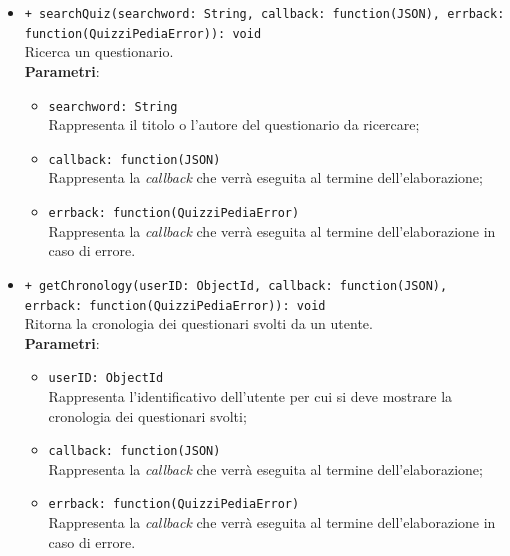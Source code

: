 \begin{itemize}
\begin{itemize}
			\item \texttt{+ searchQuiz(searchword: String, callback: function(JSON), errback: function(QuizziPediaError)): void}\\
			Ricerca un questionario.\\
			\textbf{Parametri}:
			\begin{itemize}
				\item \texttt{searchword: String}\\
				Rappresenta il titolo o l'autore del questionario da ricercare;
				\item \texttt{callback: function(JSON)}\\
				Rappresenta la \textit{callback} che verrà eseguita al termine dell'elaborazione;
				\item \texttt{errback: function(QuizziPediaError)}\\
				Rappresenta la \textit{callback} che verrà eseguita al termine dell'elaborazione in caso di errore.
			\end{itemize}
			
			\item \texttt{+ getChronology(userID: ObjectId, callback: function(JSON), errback: function(QuizziPediaError)): void}\\
			Ritorna la cronologia dei questionari svolti da un utente.\\
			\textbf{Parametri}:
			\begin{itemize}
				\item \texttt{userID: ObjectId}\\
				Rappresenta l'identificativo dell'utente per cui si deve mostrare la cronologia dei questionari svolti;
				\item \texttt{callback: function(JSON)}\\
				Rappresenta la \textit{callback} che verrà eseguita al termine dell'elaborazione;
				\item \texttt{errback: function(QuizziPediaError)}\\
				Rappresenta la \textit{callback} che verrà eseguita al termine dell'elaborazione in caso di errore.
			\end{itemize}
			

\end{itemize}
\end{itemize}
